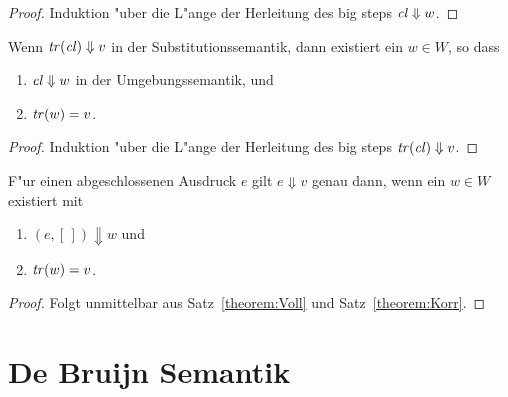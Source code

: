 \documentclass[12pt,fleqn,a4paper]{article}
\newcommand{\cl}{\name{cl}}
\begin{document}
\begin{proof}
  Induktion "uber die L"ange der Herleitung des big steps $\cl \Downarrow w$.
\end{proof}

\begin{theorem} \label{theorem:Voll}
  Wenn $\tr{\cl} \Downarrow v$ in der Substitutionssemantik, dann existiert ein $w \in W$, so dass
  \begin{enumerate}
  \item $\cl \Downarrow w$ in der Umgebungssemantik, und
  \item ${\text{\it tr\/}}(w) = v$.
  \end{enumerate}
\end{theorem}

\begin{proof}
  Induktion "uber die L"ange der Herleitung des big steps $\tr{\cl} \Downarrow v$.
\end{proof}

\begin{corollary}
  F"ur einen abgeschlossenen Ausdruck $e$ gilt $e \Downarrow v$ genau dann, wenn ein $w \in W$ existiert mit
  \begin{enumerate}
  \item $(e,[\,]) \Downarrow w$ und
  \item ${\text{\it tr\/}}(w) = v$.
  \end{enumerate}
\end{corollary}

\begin{proof}
  Folgt unmittelbar aus Satz~\ref{theorem:Voll} und Satz~\ref{theorem:Korr}.
\end{proof}

\section{De Bruijn Semantik}
\end{document}
